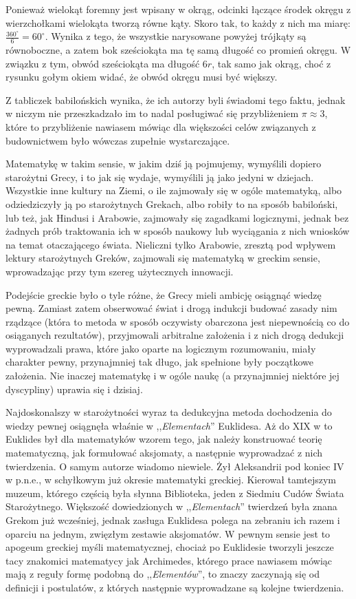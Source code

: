 \documentclass[12pt, a4paper]{article}
\begin{document}
Ponieważ wielokąt foremny jest wpisany w okrąg, odcinki łączące środek
okręgu z wierzchołkami wielokąta tworzą równe kąty. Skoro tak, to każdy z nich
ma miarę: $\frac{360^\circ}{6} = 60^\circ$. Wynika z tego, że wszystkie
narysowane powyżej trójkąty są równoboczne, a zatem bok sześciokąta ma tę samą
długość co promień okręgu. W związku z tym, obwód sześciokąta ma długość $6r$,
tak samo jak okrąg, choć z rysunku gołym okiem widać, że obwód okręgu musi być
większy.

Z tabliczek babilońskich wynika, że ich autorzy byli świadomi tego faktu, jednak
w niczym nie przeszkadzało im to nadal posługiwać się przybliżeniem $\pi
\approx 3$, które to przybliżenie nawiasem mówiąc dla większości celów
związanych z budownictwem było wówczas zupełnie wystarczające.

Matematykę w takim sensie, w jakim dziś ją pojmujemy, wymyślili dopiero
starożytni Grecy, i to jak się wydaje, wymyślili ją jako jedyni w dziejach.
Wszystkie inne kultury na Ziemi, o ile zajmowały się w ogóle matematyką, albo
odziedziczyły ją po starożytnych Grekach, albo robiły to na sposób babiloński,
lub też, jak Hindusi i Arabowie, zajmowały się zagadkami logicznymi, jednak bez
żadnych prób traktowania ich w sposób naukowy lub wyciągania z nich wniosków na
temat otaczającego świata. Nieliczni tylko Arabowie, zresztą pod wpływem lektury
starożytnych Greków, zajmowali się matematyką w greckim sensie, wprowadzając przy
tym szereg użytecznych innowacji.

Podejście greckie było o tyle różne, że Grecy mieli ambicję osiągnąć wiedzę
pewną. Zamiast zatem obserwować świat i drogą indukcji budować zasady
nim rządzące (która to metoda w sposób oczywisty obarczona jest niepewnością
co do osiąganych rezultatów), przyjmowali arbitralne założenia i z nich drogą
dedukcji wyprowadzali prawa, które jako oparte na logicznym rozumowaniu, miały
charakter pewny, przynajmniej tak długo, jak spełnione były początkowe
założenia. Nie inaczej matematykę i w ogóle naukę (a przynajmniej niektóre jej
dyscypliny) uprawia się i dzisiaj.

Najdoskonalszy w starożytności wyraz ta dedukcyjna metoda dochodzenia do wiedzy
pewnej osiągnęła właśnie w ,,\emph{Elementach}'' Euklidesa. Aż do XIX w to
Euklides był dla matematyków wzorem tego, jak należy konstruować teorię
matematyczną, jak formułować aksjomaty, a następnie wyprowadzać z nich
twierdzenia. O samym autorze wiadomo niewiele. Żył Aleksandrii pod koniec IV w
p.n.e., w schyłkowym już okresie matematyki greckiej. Kierował tamtejszym
muzeum, którego częścią była słynna Biblioteka, jeden z Siedmiu Cudów Świata
Starożytnego. Większość dowiedzionych w ,,\emph{Elementach}'' twierdzeń była
znana Grekom już wcześniej, jednak zasługa Euklidesa polega na zebraniu ich
razem i oparciu na jednym, zwięzłym zestawie aksjomatów. W pewnym sensie jest to
apogeum greckiej myśli matematycznej, chociaż po Euklidesie tworzyli jeszcze
tacy znakomici matematycy jak Archimedes, którego prace nawiasem mówiąc mają z
reguły formę podobną do ,,\emph{Elementów}'', to znaczy zaczynają się od
definicji i postulatów, z których następnie wyprowadzane są kolejne twierdzenia.
\end{document}
